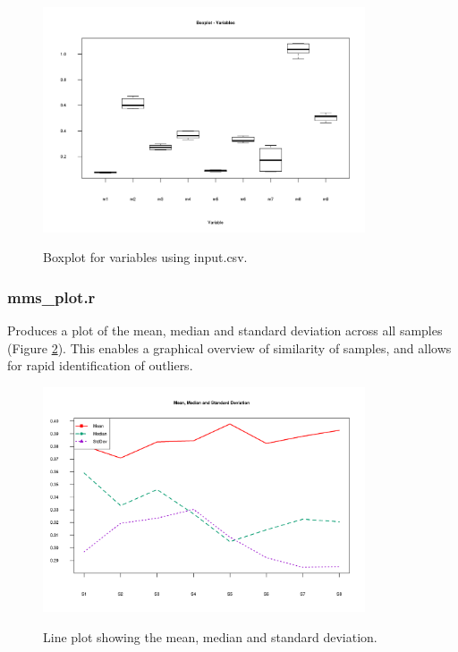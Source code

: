 \documentclass[english,a4paper,12pt]{article}
\begin{document}
\begin{figure}[!ht]
    \centering
    \includegraphics[width=0.85\textwidth]{images/boxplot_var.png} \\
    \caption[Boxplot - Variables]{Boxplot for variables using input.csv.}
    \label{fig:boxplot_var}
\end{figure}

\subsubsection*{mms\_plot.r}
Produces a plot of the mean, median and standard deviation across all samples (Figure \ref{fig:MeanMedStdev_plot}). This enables a graphical overview of similarity of samples, and allows for rapid identification of outliers.

\begin{figure}[!htb]
    \centering
    \includegraphics[width=0.85\textwidth]{images/MeanMedStdev_plot.png} \\
    \caption[Mean, Median and Standard Deviation]{Line plot showing the mean, median and standard deviation.}
    \label{fig:MeanMedStdev_plot}
\end{figure}
\end{document}
